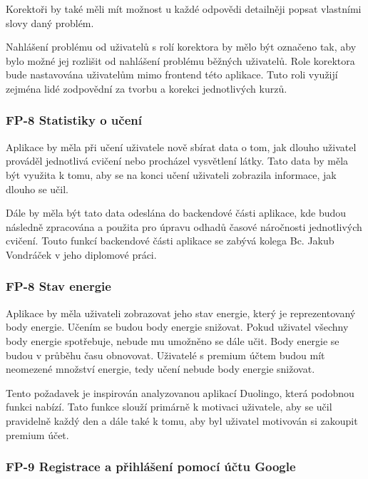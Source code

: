 Korektoři by také měli mít možnost u každé odpovědi detailněji popsat vlastními slovy daný problém. 

Nahlášení problému od uživatelů s rolí korektora by mělo být označeno tak, aby bylo možné jej rozlišit od nahlášení problému běžných uživatelů. Role korektora bude nastavována uživatelům mimo frontend této aplikace. Tuto roli využijí zejména lidé zodpovědní za tvorbu a korekci jednotlivých kurzů.

\subsubsection{FP-8 Statistiky o učení}

Aplikace by měla při učení uživatele nově sbírat data o tom, jak dlouho uživatel prováděl jednotlivá cvičení nebo procházel vysvětlení látky. Tato data by měla být využita k tomu, aby se na konci učení uživateli zobrazila informace, jak dlouho se učil. 

Dále by měla být tato data odeslána do backendové části aplikace, kde budou následně zpracována a použita pro úpravu odhadů časové náročnosti jednotlivých cvičení. Touto funkcí backendové části aplikace se zabývá kolega Bc. Jakub Vondráček v jeho diplomové práci.

\subsubsection{FP-8 Stav energie}

Aplikace by měla uživateli zobrazovat jeho stav energie, který je reprezentovaný body energie.
Učením se budou body energie snižovat. Pokud uživatel všechny body energie spotřebuje, nebude mu umožněno se dále učit. Body energie se budou v průběhu času obnovovat. Uživatelé s premium účtem budou mít neomezené množství energie, tedy učení nebude body energie snižovat.

Tento požadavek je inspirován analyzovanou aplikací Duolingo, která podobnou funkci nabízí. Tato funkce slouží primárně k motivaci uživatele, aby se učil pravidelně každý den a dále také k tomu, aby byl uživatel motivován si zakoupit premium účet.

\subsubsection{FP-9 Registrace a přihlášení pomocí účtu Google}

